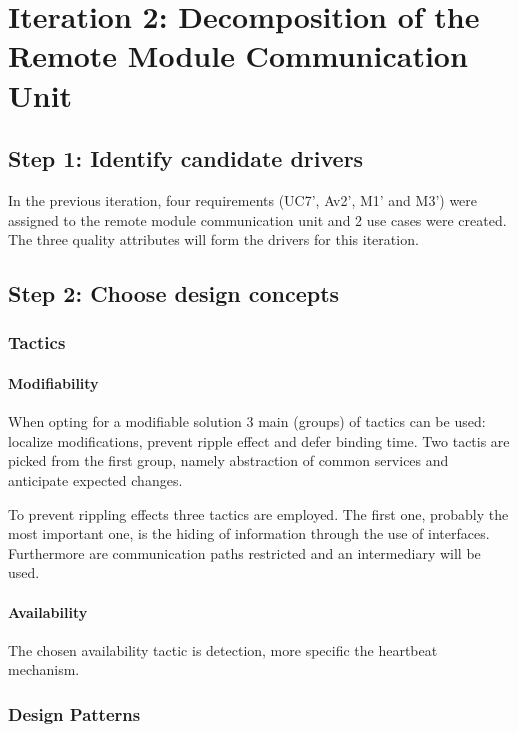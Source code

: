 \section{Iteration 2: Decomposition of the Remote Module Communication Unit}
\label{add:it2}

\subsection{Step 1: Identify candidate drivers}
\label{add:it2/drivers}

\npar In the previous iteration, four requirements (UC7', Av2', M1' and M3')
were assigned to the remote module communication unit and 2 use cases were
created. The three quality attributes will form the drivers for this iteration.

\subsection{Step 2: Choose design concepts}
\label{add:it2/concepts}

\subsubsection{Tactics}
\label{add:it2/tactics}

\paragraph{Modifiability}

\npar When opting for a modifiable solution 3 main (groups) of tactics can be
used: localize modifications, prevent ripple effect and defer binding time.
Two tactis are picked from the first group, namely abstraction of common
services and anticipate expected changes.

\npar To prevent rippling effects three tactics are employed. The first one,
probably the most important one, is the hiding of information through the use of
interfaces. Furthermore are communication paths restricted and an intermediary
will be used.

\paragraph{Availability}

\npar The chosen availability tactic is detection, more specific the heartbeat
mechanism.

\subsubsection{Design Patterns}
\label{add:it2/patterns}

